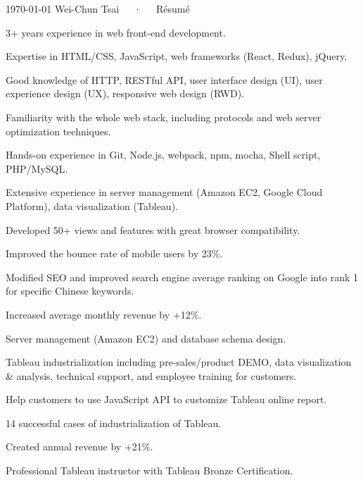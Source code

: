 \documentclass[10pt, a4paper]{puredoc-cv}
\begin{document}
\makecvtitle[L]

\makecvfooter
  {\today}
  {Wei-Chun Tsai~~~·~~~Résumé}
  {\thepage}

\begin{skipwrapper}
  \begin{cvitems}
    \item {3+ years experience in web front-end development.}
    \item {Expertise in HTML/CSS, JavaScript, web frameworks (React, Redux), jQuery.}
    \item {Good knowledge of HTTP, RESTful API, user interface design (UI), user experience design (UX), responsive web design (RWD).}
    \item {Familiarity with the whole web stack, including protocols and web server optimization techniques.}
    \item {Hands-on experience in Git, Node.js, webpack, npm, mocha, Shell script, PHP/MySQL.}
    \item {Extensive experience in server management (Amazon EC2, Google Cloud Platform), data visualization (Tableau).}
  \end{cvitems}
\end{skipwrapper}
\begin{skipwrapper}
  \begin{cvitems}
    \item {Developed 50+ views and features with great browser compatibility.}
    \item {Improved the bounce rate of mobile users by 23\%.}
    \item {Modified SEO and improved search engine average ranking on Google into rank 1 for specific Chinese keywords.}
    \item {Increased average monthly revenue by +12\%.}
    \item {Server management (Amazon EC2) and database schema design.}
  \end{cvitems}
\end{skipwrapper}
\begin{skipwrapper}
  \begin{cvitems}
    \item {Tableau industrialization including pre-sales/product DEMO, data visualization \& analysis, technical support, and employee training for customers.}
    \item {Help customers to use JavaScript API to customize Tableau online report.}
    \item {14 successful cases of industrialization of Tableau.}
    \item {Created annual revenue by +21\%.}
    \item {Professional Tableau instructor with Tableau Bronze Certification.}
  \end{cvitems}
\end{skipwrapper}
\end{document}
